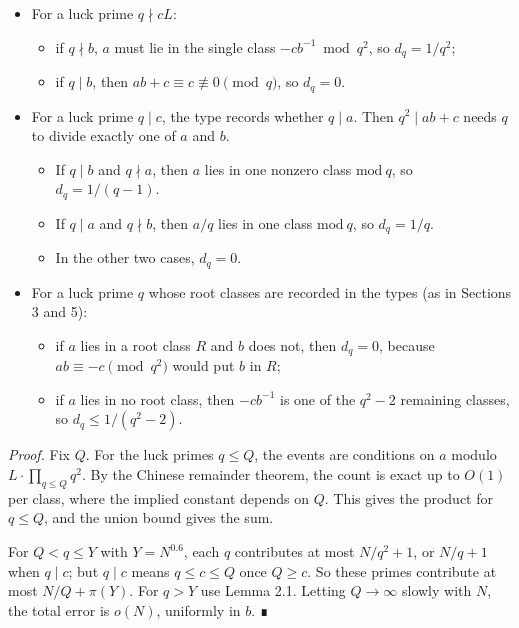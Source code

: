 \documentclass[
  11pt,
]{article}
\providecommand{\tightlist}{%
  \setlength{\itemsep}{0pt}\setlength{\parskip}{0pt}}
\begin{document}
\begin{itemize}
\tightlist
\item
  For a luck prime \(q \nmid cL\):

  \begin{itemize}
  \tightlist
  \item
    if \(q \nmid b\), \(a\) must lie in the single class
    \(-cb^{-1} \bmod q^2\), so \(d_q = 1/q^2\);
  \item
    if \(q \mid b\), then \(ab + c \equiv c \not\equiv 0 \pmod{q}\), so
    \(d_q = 0\).
  \end{itemize}
\item
  For a luck prime \(q \mid c\), the type records whether \(q \mid a\).
  Then \(q^2 \mid ab + c\) needs \(q\) to divide exactly one of \(a\)
  and \(b\).

  \begin{itemize}
  \tightlist
  \item
    If \(q \mid b\) and \(q \nmid a\), then \(a\) lies in one nonzero
    class \(\mathrm{mod}\ q\), so \(d_q = 1/(q - 1)\).
  \item
    If \(q \mid a\) and \(q \nmid b\), then \(a/q\) lies in one class
    \(\mathrm{mod}\ q\), so \(d_q = 1/q\).
  \item
    In the other two cases, \(d_q = 0\).
  \end{itemize}
\item
  For a luck prime \(q\) whose root classes are recorded in the types
  (as in Sections 3 and 5):

  \begin{itemize}
  \tightlist
  \item
    if \(a\) lies in a root class \(R\) and \(b\) does not, then
    \(d_q = 0\), because \(ab \equiv -c \pmod{q^2}\) would put \(b\) in
    \(R\);
  \item
    if \(a\) lies in no root class, then \(-cb^{-1}\) is one of the
    \(q^2 - 2\) remaining classes, so \(d_q \le 1/(q^2 - 2)\).
  \end{itemize}
\end{itemize}

\emph{Proof.} Fix \(Q\). For the luck primes \(q \le Q\), the events are
conditions on \(a\) modulo \(L\cdot\prod_{q\le Q} q^2\). By the Chinese
remainder theorem, the count is exact up to \(O(1)\) per class, where
the implied constant depends on \(Q\). This gives the product for
\(q \le Q\), and the union bound gives the sum.

For \(Q < q \le Y\) with \(Y = N^{0.6}\), each \(q\) contributes at most
\(N/q^2 + 1\), or \(N/q + 1\) when \(q \mid c\); but \(q \mid c\) means
\(q \le c \le Q\) once \(Q \ge c\). So these primes contribute at most
\(N/Q + \pi(Y)\). For \(q > Y\) use Lemma 2.1. Letting \(Q \to \infty\)
slowly with \(N\), the total error is \(o(N)\), uniformly in \(b\). ∎
\end{document}
